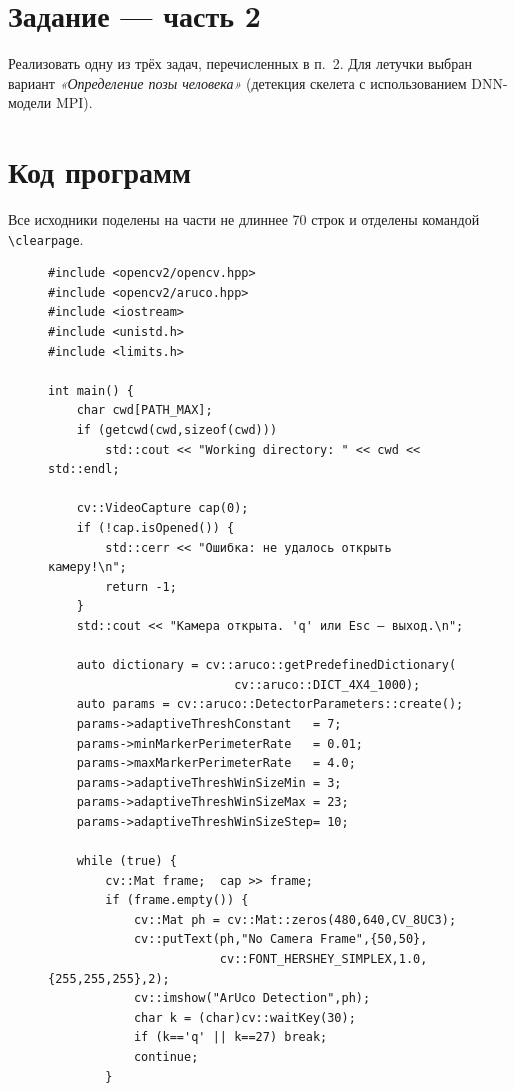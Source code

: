 \documentclass[a4paper,14pt]{extarticle}
\begin{document}
\section{Задание — часть 2}
Реализовать одну из трёх задач, перечисленных в п.~2.  
Для летучки выбран вариант \emph{«Определение позы человека»}  
(детекция скелета с использованием DNN-модели MPI).

\section{Код программ}\label{sect:listings}
Все исходники поделены на части не длиннее 70 строк и отделены
командой \verb|\clearpage|.

\begin{figure}[!htb]
\begin{lstlisting}[caption={\texttt{detect_aruco.cpp}, строки 1–70},label={lst:aruco-a},firstnumber=1,lastline=70]
#include <opencv2/opencv.hpp>
#include <opencv2/aruco.hpp>
#include <iostream>
#include <unistd.h>
#include <limits.h>

int main() {
    char cwd[PATH_MAX];
    if (getcwd(cwd,sizeof(cwd)))
        std::cout << "Working directory: " << cwd << std::endl;

    cv::VideoCapture cap(0);
    if (!cap.isOpened()) {
        std::cerr << "Ошибка: не удалось открыть камеру!\n";
        return -1;
    }
    std::cout << "Камера открыта. 'q' или Esc — выход.\n";

    auto dictionary = cv::aruco::getPredefinedDictionary(
                          cv::aruco::DICT_4X4_1000);
    auto params = cv::aruco::DetectorParameters::create();
    params->adaptiveThreshConstant   = 7;
    params->minMarkerPerimeterRate   = 0.01;
    params->maxMarkerPerimeterRate   = 4.0;
    params->adaptiveThreshWinSizeMin = 3;
    params->adaptiveThreshWinSizeMax = 23;
    params->adaptiveThreshWinSizeStep= 10;

    while (true) {
        cv::Mat frame;  cap >> frame;
        if (frame.empty()) {
            cv::Mat ph = cv::Mat::zeros(480,640,CV_8UC3);
            cv::putText(ph,"No Camera Frame",{50,50},
                        cv::FONT_HERSHEY_SIMPLEX,1.0,{255,255,255},2);
            cv::imshow("ArUco Detection",ph);
            char k = (char)cv::waitKey(30);
            if (k=='q' || k==27) break;
            continue;
        }
\end{lstlisting}
\end{figure}
\clearpage
\end{document}
